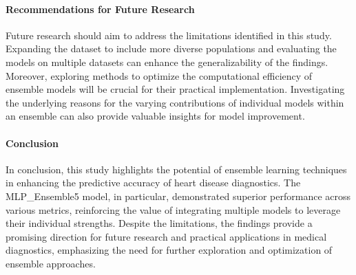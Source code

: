 \paragraph{Recommendations for Future Research}
Future research should aim to address the limitations identified in this study. Expanding the dataset to include more diverse populations and evaluating the models on multiple datasets can enhance the generalizability of the findings. Moreover, exploring methods to optimize the computational efficiency of ensemble models will be crucial for their practical implementation. Investigating the underlying reasons for the varying contributions of individual models within an ensemble can also provide valuable insights for model improvement.

\paragraph{Conclusion}
In conclusion, this study highlights the potential of ensemble learning techniques in enhancing the predictive accuracy of heart disease diagnostics. The MLP\_Ensemble5 model, in particular, demonstrated superior performance across various metrics, reinforcing the value of integrating multiple models to leverage their individual strengths. Despite the limitations, the findings provide a promising direction for future research and practical applications in medical diagnostics, emphasizing the need for further exploration and optimization of ensemble approaches.